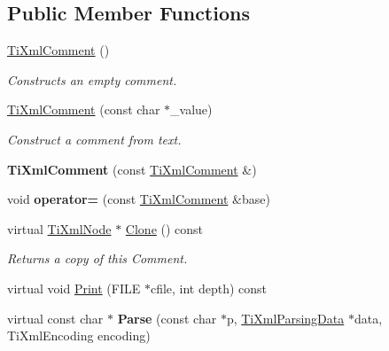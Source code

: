 \subsection*{\-Public \-Member \-Functions}
\begin{DoxyCompactItemize}
\item 
\hypertarget{classTiXmlComment_aaa3252031d3e8bd3a2bf51a1c61201b7}{
\hyperlink{classTiXmlComment_aaa3252031d3e8bd3a2bf51a1c61201b7}{\-Ti\-Xml\-Comment} ()}
\label{de/d43/classTiXmlComment_aaa3252031d3e8bd3a2bf51a1c61201b7}

\begin{DoxyCompactList}\small\item\em \-Constructs an empty comment. \end{DoxyCompactList}\item 
\hypertarget{classTiXmlComment_a37e7802ef17bc03ebe5ae79bf0713d47}{
\hyperlink{classTiXmlComment_a37e7802ef17bc03ebe5ae79bf0713d47}{\-Ti\-Xml\-Comment} (const char $\ast$\-\_\-value)}
\label{de/d43/classTiXmlComment_a37e7802ef17bc03ebe5ae79bf0713d47}

\begin{DoxyCompactList}\small\item\em \-Construct a comment from text. \end{DoxyCompactList}\item 
\hypertarget{classTiXmlComment_afaec41ac2760ce946ba1590eb5708e50}{
{\bfseries \-Ti\-Xml\-Comment} (const \hyperlink{classTiXmlComment}{\-Ti\-Xml\-Comment} \&)}
\label{de/d43/classTiXmlComment_afaec41ac2760ce946ba1590eb5708e50}

\item 
\hypertarget{classTiXmlComment_a46373f99b65cb960637dccb1f126bd49}{
void {\bfseries operator=} (const \hyperlink{classTiXmlComment}{\-Ti\-Xml\-Comment} \&base)}
\label{de/d43/classTiXmlComment_a46373f99b65cb960637dccb1f126bd49}

\item 
\hypertarget{classTiXmlComment_a4f6590c9c9a2b63a48972655b78eb853}{
virtual \hyperlink{classTiXmlNode}{\-Ti\-Xml\-Node} $\ast$ \hyperlink{classTiXmlComment_a4f6590c9c9a2b63a48972655b78eb853}{\-Clone} () const }
\label{de/d43/classTiXmlComment_a4f6590c9c9a2b63a48972655b78eb853}

\begin{DoxyCompactList}\small\item\em \-Returns a copy of this \-Comment. \end{DoxyCompactList}\item 
virtual void \hyperlink{classTiXmlComment_a17398061d62c470f57801ce28fa33ad4}{\-Print} (\-F\-I\-L\-E $\ast$cfile, int depth) const 
\item 
\hypertarget{classTiXmlComment_a43bddc18ac057734b41d84653b71d3e0}{
virtual const char $\ast$ {\bfseries \-Parse} (const char $\ast$p, \hyperlink{classTiXmlParsingData}{\-Ti\-Xml\-Parsing\-Data} $\ast$data, \-Ti\-Xml\-Encoding encoding)}
\label{de/d43/classTiXmlComment_a43bddc18ac057734b41d84653b71d3e0}


\end{DoxyCompactItemize}
